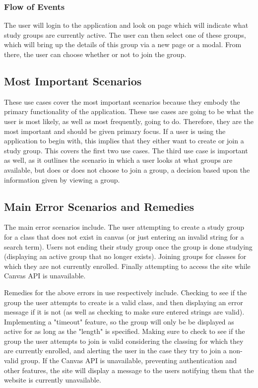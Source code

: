 \documentclass[12pt,letterpaper]{article}
\begin{document}
\subsubsection{Flow of Events}
The user will login to the application and look on page which will indicate what study groups are currently active. The user can then select one of these groups, which will bring up the details of this group via a new page or a modal. From there, the user can choose whether or not to join the group. 

\subsection{Most Important Scenarios}
These use cases cover the most important scenarios because they embody the primary functionality of the application. These use cases are going to be what the user is most likely, as well as most frequently, going to do. Therefore, they are the most important and should be given primary focus. If a user is using the application to begin with, this implies that they either want to create or join a study group. This covers the first two use cases. The third use case is important as well, as it outlines the scenario in which a user looks at what groups are available, but does or does not choose to join a group, a decision based upon the information given by viewing a group. 

\subsection{Main Error Scenarios and Remedies}
The main error scenarios include. The user attempting to create a study group for a class that does not exist in canvas (or just entering an invalid string for a search term). Users not ending their study group once the group is done studying (displaying an active group that no longer exists). Joining groups for classes for which they are not currently enrolled. Finally attempting to access the site while Canvas API is unavailable.

Remedies for the above errors in use respectively include. Checking to see if the group the user attempts to create is a valid class, and then displaying an error message if it is not (as well as checking to make sure entered strings are valid). Implementing a "timeout" feature, so the group will only be be displayed as active for as long as the "length" is specified. Making sure to check to see if the group the user attempts to join is valid considering the classing for which they are currently enrolled, and alerting the user in the case they try to join a non-valid group. If the Canvas API is unavailable, preventing authentication and other features, the site will display a message to the users notifying them that the website is currently unavailable.
\end{document}

